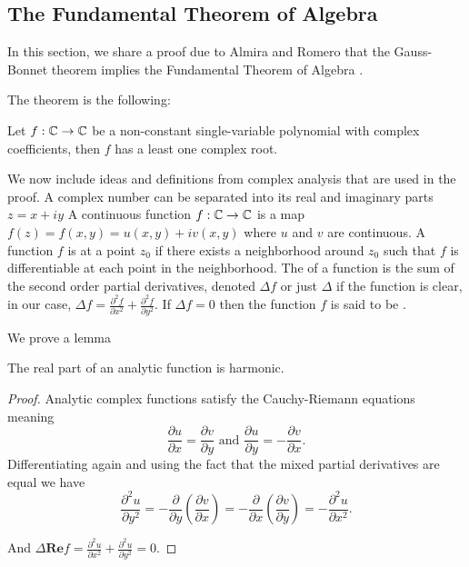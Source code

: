 \subsection{The Fundamental Theorem of Algebra}
\label{sec:fta}

In this section, we share a proof due to Almira and Romero that
the Gauss-Bonnet theorem implies the
Fundamental Theorem of Algebra \cite{almira_yet_2007}.

The theorem is the following:
\begin{theorem}\label{thm:fta}
	Let $f:\mathbb{C} \to \mathbb{C}$ be a non-constant single-variable polynomial with complex coefficients,
	then $f$ has a least one complex root.
\end{theorem}

We now include ideas and definitions from complex analysis that are used
in the proof. A complex number can be separated into its real and imaginary parts $z=x+iy$
A continuous function $f:\mathbb{C}\to \mathbb{C}$ is a map $f(z)=f(x,y)=u(x,y)+iv(x,y)$ where $u$ and $v$ are continuous.
A function $f$ is  at a point $z_0$ if there exists a neighborhood around $z_0$ 
such that $f$ is differentiable at each point in the neighborhood.
The  of a function is the sum of the second order partial derivatives, denoted $\Delta f$
or just $\Delta$ if the function is clear,
in our case, $\Delta f=\frac{\partial^2 f}{\partial x^2}+\frac{\partial^2 f}{\partial y^2}$.
If $\Delta f=0$ then the function $f$ is said to be .

We prove a lemma
\begin{lemma}\label{lem:anal-harmonic}
	The real part of an analytic function is harmonic.
\end{lemma}
\begin{proof}
	Analytic complex functions satisfy the Cauchy-Riemann equations meaning
	$$\frac{\partial u}{\partial x}=\frac{\partial v}{\partial y} \textrm{ and } \frac{\partial u}{\partial y}=- \frac{\partial v}		{\partial x}.$$
	Differentiating again and using the fact that the mixed partial derivatives are equal
	we have
	$$\frac{\partial^2 u}{\partial y^2}=-\frac{\partial}{\partial y}\left(\frac{\partial v}{\partial x}\right)
	=-\frac{\partial}{\partial x}\left(\frac{\partial v}{\partial y}\right)=-\frac{\partial^2 u}{\partial x^2}.$$

	And $\Delta \textbf{Re}f=\frac{\partial^2 u}{\partial x^2}+\frac{\partial^2 u}{\partial y^2}=0$.
\end{proof}



